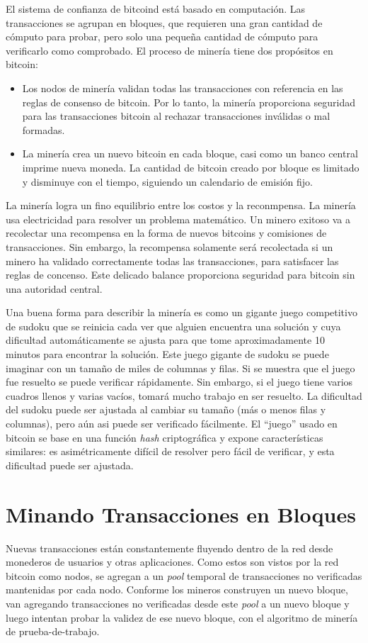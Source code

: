 \documentclass[10pt,journal,compsoc]{IEEEtran}
\begin{document}
El sistema de confianza de bitcoind está basado en computación. Las transacciones se agrupan en bloques, que requieren una gran cantidad de cómputo para probar, pero solo una pequeña cantidad de cómputo para verificarlo como comprobado. El proceso de minería tiene dos propósitos en bitcoin:
\begin{itemize}
    \item Los nodos de minería validan todas las transacciones con referencia en las reglas de consenso de bitcoin. Por lo tanto, la minería proporciona seguridad para las transacciones bitcoin al rechazar transacciones inválidas o mal formadas.
    \item La minería crea un nuevo bitcoin en cada bloque, casi como un banco central imprime nueva moneda. La cantidad de bitcoin creado por bloque es limitado y disminuye con el tiempo, siguiendo un calendario de emisión fijo.  
\end{itemize}

La minería logra un fino equilibrio entre los costos y la reconmpensa. La minería usa electricidad para resolver un problema matemático. Un minero exitoso va a recolectar una recompensa en la forma de nuevos bitcoins y comisiones de transacciones. Sin embargo, la recompensa solamente será recolectada si un minero ha validado correctamente todas las transacciones, para satisfacer las reglas de concenso. Este delicado balance proporciona seguridad para bitcoin sin una autoridad central.

Una buena forma para describir la minería es como un gigante juego competitivo de sudoku que se reinicia cada ver que alguien encuentra una solución y cuya dificultad automáticamente se ajusta para que tome aproximadamente 10 minutos para encontrar la solución. Este juego gigante de sudoku se puede imaginar con un tamaño de miles de columnas y filas. Si se muestra que el juego fue resuelto se puede verificar rápidamente. Sin embargo, si el juego tiene varios cuadros llenos y varias vacíos, tomará mucho trabajo en ser resuelto. La dificultad del sudoku puede ser ajustada al cambiar su tamaño (más o menos filas y columnas), pero aún asi puede ser verificado fácilmente. El ``juego'' usado en bitcoin se base en una función \emph{hash} criptográfica y expone características similares: es asimétricamente difícil de resolver pero fácil de verificar, y esta dificultad puede ser ajustada.

\section{Minando Transacciones en Bloques}
Nuevas transacciones están constantemente fluyendo dentro de la red desde monederos de usuarios y otras aplicaciones. Como estos son vistos por la red bitcoin como nodos, se agregan a un \emph{pool} temporal de transacciones no verificadas mantenidas por cada nodo. Conforme los mineros construyen un nuevo bloque, van agregando transacciones no verificadas desde este \emph{pool} a un nuevo bloque y luego intentan probar la validez de ese nuevo bloque, con el algoritmo de minería de prueba-de-trabajo. 
\end{document}
